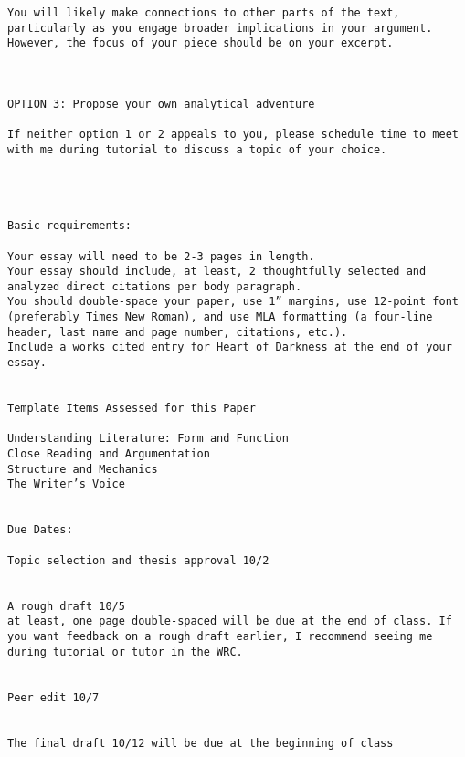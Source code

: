 \documentclass[letterpaper]{article}
\begin{document}
\begin{verbatim}
You will likely make connections to other parts of the text, particularly as you engage broader implications in your argument. However, the focus of your piece should be on your excerpt.



OPTION 3: Propose your own analytical adventure

If neither option 1 or 2 appeals to you, please schedule time to meet with me during tutorial to discuss a topic of your choice. 




Basic requirements:

Your essay will need to be 2-3 pages in length.
Your essay should include, at least, 2 thoughtfully selected and analyzed direct citations per body paragraph. 
You should double-space your paper, use 1” margins, use 12-point font (preferably Times New Roman), and use MLA formatting (a four-line header, last name and page number, citations, etc.).
Include a works cited entry for Heart of Darkness at the end of your essay.


Template Items Assessed for this Paper

Understanding Literature: Form and Function
Close Reading and Argumentation
Structure and Mechanics
The Writer’s Voice


Due Dates:

Topic selection and thesis approval 10/2 


A rough draft 10/5 
at least, one page double-spaced will be due at the end of class. If you want feedback on a rough draft earlier, I recommend seeing me during tutorial or tutor in the WRC.


Peer edit 10/7 


The final draft 10/12 will be due at the beginning of class
\end{verbatim}
\end{document}
